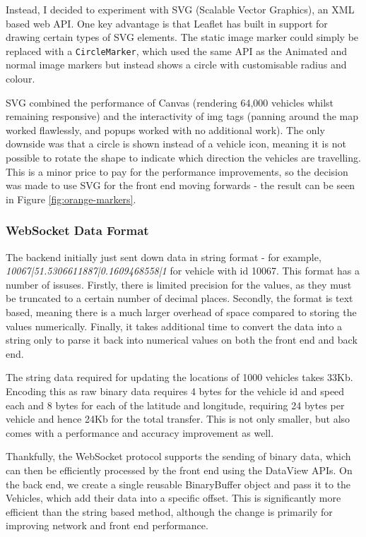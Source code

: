 \documentclass[ %
                    author={Alexander Hill},
                supervisor={Dr. Benjamin Sach},
                    degree={MEng},
                     title={MARMOSET},
                  subtitle={Multi-Agent Route Management using Online Simulation for Efficient Transportation},
                      type={research},
                      year={2016} ]{dissertation}
\begin{document}
Instead, I decided to experiment with SVG (Scalable Vector Graphics), an XML
based web API. One key advantage is that Leaflet has built in support for
drawing certain types of SVG elements. The static image marker could simply be
replaced with a \texttt{CircleMarker}, which used the same API as the Animated
and normal image markers but instead shows a circle with customisable radius and
colour.

SVG combined the performance of Canvas (rendering 64,000 vehicles whilst
remaining responsive) and the interactivity of img tags (panning around the map
worked flawlessly, and popups worked with no additional work). The only downside
was that a circle is shown instead of a vehicle icon, meaning it is not possible
to rotate the shape to indicate which direction the vehicles are travelling.
This is a minor price to pay for the performance improvements, so the decision
was made to use SVG for the front end moving forwards - the result can be seen
in Figure \ref{fig:orange-markers}.

\subsubsection{WebSocket Data Format}

The backend initially just sent down data in string format - for example,
\textit{10067|51.5306611887|0.1609468558|1} for vehicle with id 10067. This
format has a number of issuses. Firstly, there is limited precision for the
values, as they must be truncated to a certain number of decimal places.
Secondly, the format is text based, meaning there is a much larger overhead of
space compared to storing the values numerically. Finally, it takes additional
time to convert the data into a string only to parse it back into numerical
values on both the front end and back end.

The string data required for updating the locations of 1000 vehicles takes 33Kb.
Encoding this as raw binary data requires 4 bytes for the vehicle id and speed
each and 8 bytes for each of the latitude and longitude, requiring 24 bytes per
vehicle and hence 24Kb for the total transfer.  This is not only smaller, but
also comes with a performance and accuracy improvement as well.

Thankfully, the WebSocket protocol supports the sending of binary data, which
can then be efficiently processed by the front end using the DataView APIs. On
the back end, we create a single reusable BinaryBuffer object and pass it to the
Vehicles, which add their data into a specific offset. This is significantly
more efficient than the string based method, although the change is primarily
for improving network and front end performance.
\end{document}
